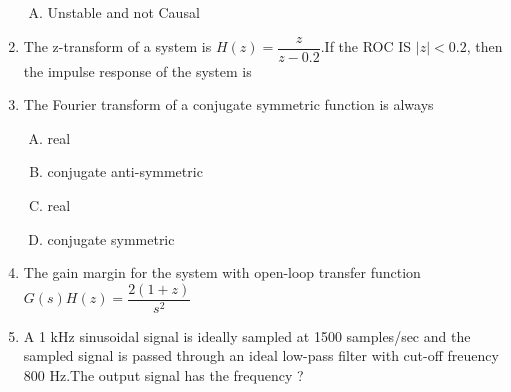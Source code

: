 \documentclass[journal,12pt,twocolumn]{IEEEtran}
\begin{document}
\begin{enumerate}
\begin{enumerate}[(A)]
\item 
Unstable and not Causal


\end{enumerate}


\item The z-transform of a system is $H(z)=\dfrac{z}{z-0.2}$.If the ROC IS $|z|<0.2$, then the impulse response of the system is

\begin{enumerate}[(A)]
\end{enumerate}

\item The Fourier transform of a conjugate symmetric function is always
\begin{enumerate}[(A)]

\setlength\itemsep{2em}
\item real
\item conjugate anti-symmetric
\item real
\item conjugate symmetric

\end{enumerate}

\item The gain margin for the system with open-loop transfer function $G(s)H(z)=\dfrac{2(1+z)}{s^{2}}$

\begin{enumerate}[(A)]
\end{enumerate}

\item A 1 kHz sinusoidal signal is ideally sampled at 1500 samples/sec and the sampled signal is passed through an ideal low-pass filter with cut-off freuency 800 Hz.The output signal has the frequency ?




\end{enumerate}
\end{document}
